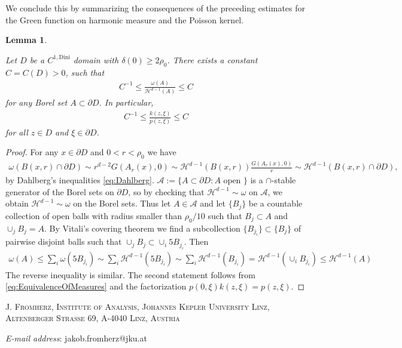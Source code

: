\documentclass[a4paper,12pt]{article}
\newtheorem{lemma}[theorem]{Lemma}
\theoremstyle{definition}
\theoremstyle{definition}
\begin{document}
	We conclude this by summarizing the consequences of the preceding estimates for the Green function on harmonic measure and the Poisson kernel.
	\begin{lemma}\label{lem:harmeasVShausdorff}
		
		Let $D$ be a $C^{1,\mathrm{Dini}}$ domain with $\delta(0)\geq 2\rho_0$. There exists a constant $C=C(D)>0$, such that
		\begin{align}\label{eq:EquivalenceOfMeasures}
			C^{-1}\leq\frac{\omega(A)}{\mathcal{H}^{d-1}(A)}\leq C
		\end{align}
		for any Borel set $A\subset\partial D$.
		In particular, 
		\begin{align*}
			C^{-1}\leq\frac{k(z,\xi)}{p(z,\xi)}\leq C
		\end{align*}
		for all $z\in D$ and $\xi\in\partial D$.
	\end{lemma}
	\begin{proof}
		For any $x\in\partial D$ and $0<r<\rho_0$ we have 
		\begin{align*}
			\omega(B(x,r)\cap\partial D)\sim r^{d-2} G(A_r(x),0)\sim\mathcal{H}^{d-1}(B(x,r))\frac{G(A_r(x),0)}{r}\sim\mathcal{H}^{d-1}(B(x,r)\cap \partial D),
		\end{align*}
		by Dahlberg's inequalities \eqref{eq:Dahlberg}. $\mathcal{A}:=\lbrace A\subset\partial D: A \text{ open } \rbrace$ is a $\cap$-stable generator of the Borel sets on $\partial D$, so by checking that $\mathcal H^{d-1}\sim\omega$ on $\mathcal A$, we obtain $\mathcal H^{d-1}\sim\omega$ on the Borel sets. Thus let $A\in \mathcal{A}$ and let $\lbrace B_j\rbrace$ be a countable collection of open balls with radius smaller than $\rho_0/10$ such that $B_j\subset A$ and $\cup_jB_j=A$. By Vitali's covering theorem we find a subcollection $\lbrace B_{j_i}\rbrace\subset \lbrace B_{j}\rbrace$ of pairwise disjoint balls  such that $\cup_jB_j\subset\cup_i 5B_{j_i}$. Then
		\begin{align*}
			\omega(A)\leq\sum_i\omega(5B_{j_i})\sim\sum_i\mathcal H^{d-1}(5B_{j_i})\sim \sum_i\mathcal H^{d-1}(B_{j_i})=\mathcal{H}^{d-1}\left(\cup_iB_{j_i}\right)\leq\mathcal{H}^{d-1}(A)
		\end{align*}
		The reverse inequality is similar. The second statement follows from \eqref{eq:EquivalenceOfMeasures} and the factorization $p(0,\xi)k(z,\xi)=p(z,\xi)$.		
	\end{proof}
	\newpage
	\printbibliography[heading=bibintoc, title={References}]
	\textsc{J. Fromherz, Institute of Analysis, Johannes Kepler University Linz, 				Altenberger Strasse 69, A-4040 Linz, Austria}
	
	\textit{E-mail address}: jakob.fromherz@jku.at
		
\end{document}
